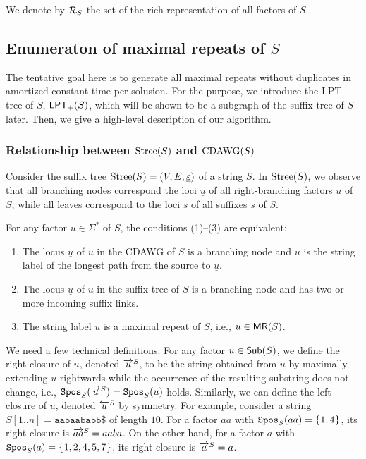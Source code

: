 \documentclass{article}
\begin{document}
We denote by $\RR$ the set of the rich-representation of all factors of $S$.

\subsection{Enumeraton of maximal repeats of $S$}  
The tentative goal here is to generate all maximal repeats without duplicates in amortized constant time per solusion. For the purpose, we introduce the LPT tree of $S$, $\LPT[+](S)$, which will be shown to be a subgraph of the suffix tree of $S$ later. Then, we give a high-level description of our algorithm.

\subsubsection{Relationship between $\Stree(S)$ and $\CDAWG(S)$}
Consider the suffix tree $\Stree(S) = (V, E, \underline\eps)$ of a string $S$. 
In $\Stree(S)$, we observe that all branching nodes correspond the loci $\underline u$ of all right-branching factors $u$ of $S$, while all leaves correspond to the loci $\underline s$ of all suffixes $s$ of $S$.

\begin{remark}\label{remark:one:primary}
  For any factor $u \in \Sigma^*$ of $S$, the conditions (1)--(3) are equivalent:
  \begin{enumerate}[(1)]
  \item The locus $\underline{u}$ of $u$ in the CDAWG of $S$ is a branching node and $u$ is the string label of the longest path from the source to $\underline{u}$. 
  \item The locus $\underline{u}$ of $u$ in the suffix tree of $S$ is a branching node and has two or more incoming suffix links. 
  \item The string label $u$ is a maximal repeat of $S$, i.e., $u \in \MR(S)$. 
  \end{enumerate}
\end{remark}

We need a few technical definitions. 
For any factor $u \in \Sub(S)$, we define the right-closure of $u$, denoted $\rext{u}$, to be the string obtained from $u$ by maximally extending $u$ rightwards while the occurrence of the resulting substring does not change, i.e., $\Spos(\rext{u}) = \Spos(u)$ holds.
Similarly, we can define the left-closure of $u$, denoted $\lext{u}$ by symmetry. 
For example, consider a string  $S[1..n] = \mathtt{aabaababb\$}$ of length $10$. For a factor $aa$ with $\Spos(aa) = \set{1, 4}$, its right-closure is $\rext{aa} = aaba$. On the other hand, for a factor $a$ with $\Spos(a) = \set{1,2,4,5,7}$, its right-closure is $\rext{a} = a$. 
\end{document}
